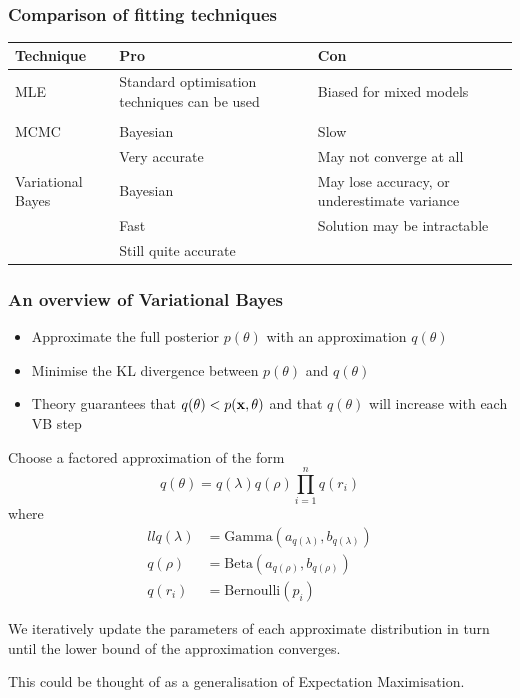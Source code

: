 \documentclass{beamer}
\begin{document}
\
\begin{frame}
\frametitle{Comparison of fitting techniques}
\begin{tabular}{p{2cm}p{3.75cm}p{3.75cm}}
Technique & Pro & Con \\
\hline
MLE & Standard optimisation techniques can be used & Biased for mixed models \\
& & \\ %
\hline
MCMC & Bayesian & Slow \\
	& Very accurate &  May not converge at all \\
\hline
Variational Bayes & Bayesian & May lose accuracy, or underestimate variance \\
& Fast  & Solution may be intractable \\ 
& Still quite accurate & \\
\hline
\end{tabular}

\end{frame}

\begin{frame}
\frametitle{An overview of Variational Bayes}
\begin{itemize}
\item Approximate the full posterior $p(\theta)$ with an approximation $q(\theta)$
\item Minimise the KL divergence between $p(\theta)$ and $q(\theta)$
\item Theory guarantees that $q(\theta) < p(\bf x, \theta)$ and that $q(\theta)$ will
increase with each VB step
\end{itemize}
\end{frame}

\begin{frame}
Choose a factored approximation of the form
$$
q(\theta) = q(\lambda) q(\rho) \prod_{i=1}^n q(r_i)
$$
where
\begin{align*}{ll}
q(\lambda) &= \text{Gamma}(a_{q(\lambda)}, b_{q(\lambda)}) \\
q(\rho) &= \text{Beta}(a_{q(\rho)}, b_{q(\rho)}) \\
q(r_i) &= \text{Bernoulli}(p_i)
\end{align*}

We iteratively update the parameters of each approximate distribution
in turn until the lower bound of the approximation converges.

This could be thought of as a generalisation of Expectation Maximisation.
\end{frame}
\end{document}

